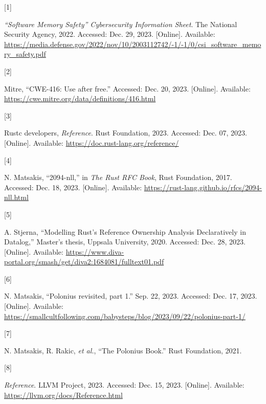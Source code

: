 \documentclass[
  11pt,
  twoside,symmetric]{report}
\newlength{\cslhangindent}
\newlength{\csllabelwidth}
\newlength{\cslentryspacingunit} %
\newenvironment{CSLReferences}[2] %
 {%
  \setlength{\parindent}{0pt}
  \ifodd #1
  \let\oldpar\par
  \def\par{\hangindent=\cslhangindent\oldpar}
  \fi
  \setlength{\parskip}{#2\cslentryspacingunit}
 }%
 {}
\newcommand{\CSLLeftMargin}[1]{\parbox[t]{\csllabelwidth}{#1}}
\newcommand{\CSLRightInline}[1]{\parbox[t]{\linewidth - \csllabelwidth}{#1}\break}
\begin{document}
\hypertarget{refs}{}
\begin{CSLReferences}{0}{0}
\leavevmode{}%
\CSLLeftMargin{{[}1{]} }%
\CSLRightInline{\emph{{{``Software Memory Safety''}} {C}ybersecurity
{I}nformation {S}heet}. The National Security Agency, 2022. Accessed:
Dec. 29, 2023. {[}Online{]}. Available:
\url{https://media.defense.gov/2022/nov/10/2003112742/-1/-1/0/csi_software_memory_safety.pdf}}

\leavevmode{}%
\CSLLeftMargin{{[}2{]} }%
\CSLRightInline{Mitre, {``CWE-416: Use after free.''} Accessed: Dec. 20,
2023. {[}Online{]}. Available:
\url{https://cwe.mitre.org/data/definitions/416.html}}

\leavevmode{}%
\CSLLeftMargin{{[}3{]} }%
\CSLRightInline{Rustc developers, \emph{Reference}. Rust Foundation,
2023. Accessed: Dec. 07, 2023. {[}Online{]}. Available:
\url{https://doc.rust-lang.org/reference/}}

\leavevmode{}%
\CSLLeftMargin{{[}4{]} }%
\CSLRightInline{N. Matsakis, {``2094-nll,''} in \emph{The {R}ust {RFC}
{B}ook}, Rust Foundation, 2017. Accessed: Dec. 18, 2023. {[}Online{]}.
Available: \url{https://rust-lang.github.io/rfcs/2094-nll.html}}

\leavevmode{}%
\CSLLeftMargin{{[}5{]} }%
\CSLRightInline{A. Stjerna, {``{M}odelling {R}ust's {R}eference
{O}wnership {A}nalysis {D}eclaratively in {D}atalog,''} Master's thesis,
Uppsala University, 2020. Accessed: Dec. 28, 2023. {[}Online{]}.
Available:
\url{https://www.diva-portal.org/smash/get/diva2:1684081/fulltext01.pdf}}

\leavevmode{}%
\CSLLeftMargin{{[}6{]} }%
\CSLRightInline{N. Matsakis, {``Polonius revisited, part 1.''} Sep. 22,
2023. Accessed: Dec. 17, 2023. {[}Online{]}. Available:
\url{https://smallcultfollowing.com/babysteps/blog/2023/09/22/polonius-part-1/}}

\leavevmode{}%
\CSLLeftMargin{{[}7{]} }%
\CSLRightInline{N. Matsakis, R. Rakic, \emph{et al.}, {``{T}he
{P}olonius {B}ook.''} Rust Foundation, 2021.}

\leavevmode{}%
\CSLLeftMargin{{[}8{]} }%
\CSLRightInline{\emph{Reference}. LLVM Project, 2023. Accessed: Dec. 15,
2023. {[}Online{]}. Available:
\url{https://llvm.org/docs/Reference.html}}


\end{CSLReferences}
\end{document}
